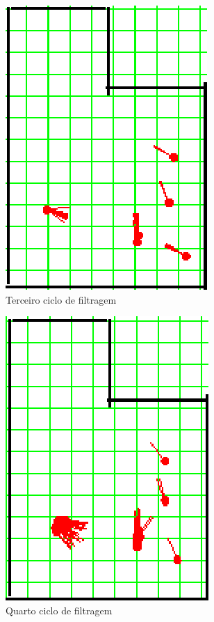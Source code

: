 \begin{figure}[H]
  \centering
  \includegraphics[scale=1]{figuras/cen3_ex3/4.eps}
  \caption[Terceiro Ciclo de Filtragem]{Terceiro ciclo de filtragem}
  \label{img:cen3_ex3_4}
\end{figure}

\begin{figure}[H]
  \centering
  \includegraphics[scale=1]{figuras/cen3_ex3/5.eps}
  \caption[Quarto Ciclo de Filtragem]{Quarto ciclo de filtragem}
  \label{img:cen3_ex3_5}
\end{figure}

